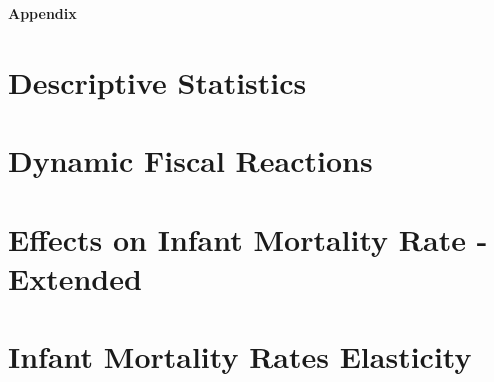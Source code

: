 
\LARGE{\textbf{Appendix}}





\section{Descriptive Statistics}\label{app:stats}






\pagebreak
\section{Dynamic Fiscal Reactions}\label{app:fiscal}




\clearpage
\pagebreak

\section{Effects on Infant Mortality Rate - Extended}\label{app:imr}




\pagebreak

\section{Infant Mortality Rates Elasticity}\label{app:elasticity}

